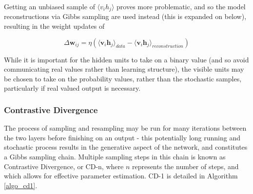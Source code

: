 \documentclass[a4paper,11pt,oneside]{article}
\theoremstyle{plain}
\theoremstyle{definition}
\begin{document}
	
	Getting an unbiased sample of $\langle v_i h_j \rangle$ proves more problematic, and so the model reconstructions via Gibbs sampling are used instead (this is expanded on below), resulting in the weight updates of
	
	\begin{equation}
	\Delta \mathbf{w}_{ij} = \eta (\langle \mathbf{v}_i\mathbf{h}_j\rangle_{data} - \langle \mathbf{v}_i\mathbf{h}_j\rangle_{reconstruction})
	\end{equation}
	
	While it is important for the hidden units to take on a binary value (and so avoid communicating real values rather than learning structure), the visible units may be chosen to take on the probability values, rather than the stochastic samples, particularly if real valued output is necessary. 
	
	\subsubsection{Contrastive Divergence}\label{imp_CD}
	
	The process of sampling and resampling may be run for many iterations between the two layers before finishing on an output - this potentially long running and stochastic process results in the generative aspect of the network, and constitutes a Gibbs sampling chain. Multiple sampling steps in this chain is known as Contrastive Divergence, or CD-n, where $n$ represents the number of steps, and which allows for effective parameter estimation. CD-1 is detailed in Algorithm \ref{algo_cd1}.\newline
	
\end{document}
